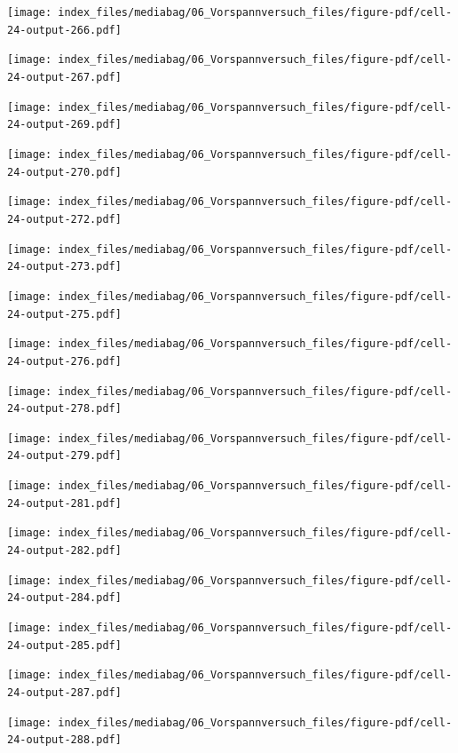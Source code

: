 \documentclass[
  11pt,
  letterpaper,
]{scrreprt}
\begin{document}
\newpage{}

\texttt{[image: index\_files/mediabag/06\_Vorspannversuch\_files/figure-pdf/cell-24-output-266.pdf]}

\texttt{[image: index\_files/mediabag/06\_Vorspannversuch\_files/figure-pdf/cell-24-output-267.pdf]}

\newpage{}

\texttt{[image: index\_files/mediabag/06\_Vorspannversuch\_files/figure-pdf/cell-24-output-269.pdf]}

\texttt{[image: index\_files/mediabag/06\_Vorspannversuch\_files/figure-pdf/cell-24-output-270.pdf]}

\newpage{}

\texttt{[image: index\_files/mediabag/06\_Vorspannversuch\_files/figure-pdf/cell-24-output-272.pdf]}

\texttt{[image: index\_files/mediabag/06\_Vorspannversuch\_files/figure-pdf/cell-24-output-273.pdf]}

\newpage{}

\texttt{[image: index\_files/mediabag/06\_Vorspannversuch\_files/figure-pdf/cell-24-output-275.pdf]}

\texttt{[image: index\_files/mediabag/06\_Vorspannversuch\_files/figure-pdf/cell-24-output-276.pdf]}

\newpage{}

\texttt{[image: index\_files/mediabag/06\_Vorspannversuch\_files/figure-pdf/cell-24-output-278.pdf]}

\texttt{[image: index\_files/mediabag/06\_Vorspannversuch\_files/figure-pdf/cell-24-output-279.pdf]}

\newpage{}

\texttt{[image: index\_files/mediabag/06\_Vorspannversuch\_files/figure-pdf/cell-24-output-281.pdf]}

\texttt{[image: index\_files/mediabag/06\_Vorspannversuch\_files/figure-pdf/cell-24-output-282.pdf]}

\newpage{}

\texttt{[image: index\_files/mediabag/06\_Vorspannversuch\_files/figure-pdf/cell-24-output-284.pdf]}

\texttt{[image: index\_files/mediabag/06\_Vorspannversuch\_files/figure-pdf/cell-24-output-285.pdf]}

\newpage{}

\texttt{[image: index\_files/mediabag/06\_Vorspannversuch\_files/figure-pdf/cell-24-output-287.pdf]}

\texttt{[image: index\_files/mediabag/06\_Vorspannversuch\_files/figure-pdf/cell-24-output-288.pdf]}
\end{document}
